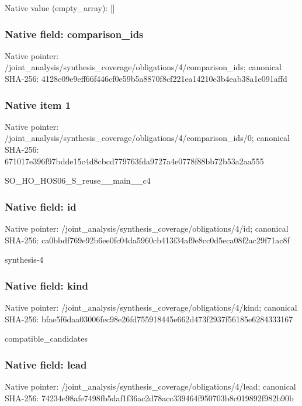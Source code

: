 \documentclass[10pt,a4paper]{article}
\begin{document}
Native value (empty\_\allowbreak{}array): []

\subsubsection{Native field: comparison\_\allowbreak{}ids}
Native pointer: /joint\_\allowbreak{}analysis/synthesis\_\allowbreak{}coverage/obligations/4/comparison\_\allowbreak{}ids; canonical SHA-256: 4128c09e9eff66f446cf0e59b5a8870f8cf221ea14210e3b4eab38a1e091affd

\subsubsection{Native item 1}
Native pointer: /joint\_\allowbreak{}analysis/synthesis\_\allowbreak{}coverage/obligations/4/comparison\_\allowbreak{}ids/0; canonical SHA-256: 671017e396f97bdde15c4d8cbcd779763fda9727a4e0778f88bb72b53a2aa555

\begingroup\raggedright\sloppy SO\_\allowbreak{}HO\_\allowbreak{}HOS06\_\allowbreak{}S\_\allowbreak{}reuse\_\allowbreak{}\_\allowbreak{}main\_\allowbreak{}\_\allowbreak{}c4\par\endgroup

\subsubsection{Native field: id}
Native pointer: /joint\_\allowbreak{}analysis/synthesis\_\allowbreak{}coverage/obligations/4/id; canonical SHA-256: ca0bbdf769e92b6ee0fc04da5960cb413f34af9e8cc0d5eca08f2ac29f71ac8f

\begingroup\raggedright\sloppy synthesis-4\par\endgroup

\subsubsection{Native field: kind}
Native pointer: /joint\_\allowbreak{}analysis/synthesis\_\allowbreak{}coverage/obligations/4/kind; canonical SHA-256: bfae5f6daa03006fec98e26fd755918445e662d473f2937f56185e6284333167

\begingroup\raggedright\sloppy compatible\_\allowbreak{}candidates\par\endgroup

\subsubsection{Native field: lead}
Native pointer: /joint\_\allowbreak{}analysis/synthesis\_\allowbreak{}coverage/obligations/4/lead; canonical SHA-256: 74234e98afe7498fb5daf1f36ac2d78acc339464f950703b8c019892f982b90b
\end{document}
